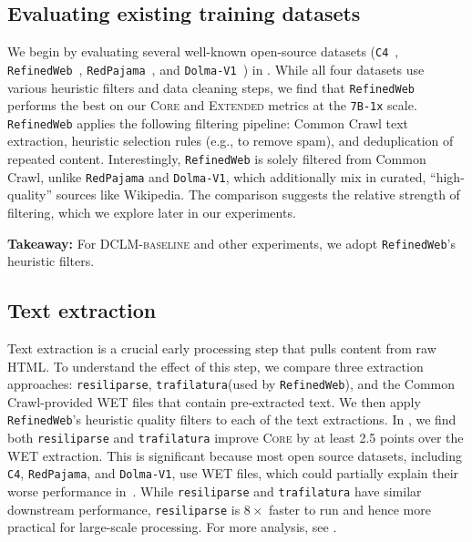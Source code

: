 \documentclass{article}
\newcommand{\takeawaybox}[1]{%
  \begin{tcolorbox}[
    colback=blue!10,
    colframe=blue!50,
    boxrule=0.5pt,
    arc=0mm,
    left=5pt,
    right=5pt,
    top=2pt,
    bottom=2pt,
    fontupper={\fontsize{9.5pt}{11.75pt}\selectfont}
  ]
    \textbf{Takeaway:} #1
  \end{tcolorbox}%
  \vspace*{-0.1cm}
}
\newcommand{\hqpool}{\textsc{DCLM-baseline}\xspace}
\newcommand{\ltrack}{\texttt{7B-1x}\xspace}
\newcommand{\cfour}{\texttt{C4}\xspace}
\newcommand{\rpj}{\texttt{RedPajama}\xspace}
\newcommand{\rw}{\texttt{RefinedWeb}\xspace}
\newcommand{\dolma}{\texttt{Dolma-V1}\xspace}
\newcommand{\trafilatura}{\texttt{trafilatura}\xspace}
\newcommand{\resiliparse}{\texttt{resiliparse}\xspace}
\newcommand{\lowvar}{\textsc{Core}\xspace}
\newcommand{\aggscore}{\textsc{Extended}\xspace}
\newcommand{\commoncrawl}{Common Crawl\xspace}
\newlength{\oldintextsep}
\begin{document}
\setlength{\oldintextsep}{\intextsep}
\setlength\intextsep{0.5em}

\subsection{Evaluating existing training datasets}
\label{subsec:existing-datasets}

We begin by evaluating several well-known open-source datasets (\cfour~\citep{c4,c4_ai2}, \rw~\citep{refinedweb}, \rpj~\citep{rpj}, and \dolma~\citep{soldaini2024dolma}) in .
While all four datasets use various heuristic filters and data cleaning steps,
we find that \rw performs the best on our \lowvar and \aggscore metrics at the \ltrack scale.
\rw applies the following filtering pipeline: \commoncrawl text extraction, heuristic selection rules (e.g., to remove spam), and deduplication of repeated content.
Interestingly, \rw is solely filtered from \commoncrawl, unlike \rpj and \dolma, which additionally mix in curated, ``high-quality'' sources like Wikipedia.
The comparison suggests the relative strength of filtering, which we explore later in our experiments.


\begin{table}[b]
\centering
\caption{
\textbf{Comparison to existing datasets} (\ltrack{} scale).
Despite not mixing high-quality sources (unlike \dolma and \rpj), \rw performs best.
}
\label{tab:existing_datasets}

\end{table}
\setlength{\intextsep}{\oldintextsep}


\takeawaybox{For \hqpool{} and other experiments, we adopt \rw{}'s heuristic filters.}

\subsection{Text extraction}
\label{sec:text_extraction}

Text extraction is a crucial early processing step that pulls content from raw HTML. To understand the effect of this step, we compare three extraction approaches: \resiliparse, \trafilatura (used by \rw), and the \commoncrawl-provided WET files that contain pre-extracted text.
We then apply \rw{}'s heuristic quality filters to each of the text extractions.
In , we find both \resiliparse and \trafilatura improve \lowvar by at least 2.5 points over the WET extraction.
This is significant because most open source datasets, including \cfour, \rpj, and \dolma, use WET files, which could partially explain their worse performance in~.
While \resiliparse and \trafilatura have similar downstream performance, \resiliparse is $8\times$ faster to run and hence more practical for large-scale processing.
For more analysis, see .
\end{document}
